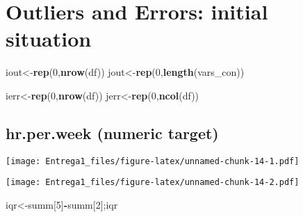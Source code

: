 \documentclass[12pt,]{article}
\newenvironment{Shaded}{\begin{snugshade}}{\end{snugshade}}
\newcommand{\DataTypeTok}[1]{\textcolor[rgb]{0.13,0.29,0.53}{#1}}
\newcommand{\DecValTok}[1]{\textcolor[rgb]{0.00,0.00,0.81}{#1}}
\newcommand{\KeywordTok}[1]{\textcolor[rgb]{0.13,0.29,0.53}{\textbf{#1}}}
\newcommand{\NormalTok}[1]{#1}
\newcommand{\OperatorTok}[1]{\textcolor[rgb]{0.81,0.36,0.00}{\textbf{#1}}}
\newcommand{\StringTok}[1]{\textcolor[rgb]{0.31,0.60,0.02}{#1}}
\begin{document}
\hypertarget{outliers-and-errors-initial-situation}{%
\section{Outliers and Errors: initial
situation}\label{outliers-and-errors-initial-situation}}

\begin{Shaded}
\begin{Highlighting}[]
\NormalTok{iout<-}\KeywordTok{rep}\NormalTok{(}\DecValTok{0}\NormalTok{,}\KeywordTok{nrow}\NormalTok{(df))}
\NormalTok{jout<-}\KeywordTok{rep}\NormalTok{(}\DecValTok{0}\NormalTok{,}\KeywordTok{length}\NormalTok{(vars_con))}

\NormalTok{ierr<-}\KeywordTok{rep}\NormalTok{(}\DecValTok{0}\NormalTok{,}\KeywordTok{nrow}\NormalTok{(df))}
\NormalTok{jerr<-}\KeywordTok{rep}\NormalTok{(}\DecValTok{0}\NormalTok{,}\KeywordTok{ncol}\NormalTok{(df))}
\end{Highlighting}
\end{Shaded}

\hypertarget{hr.per.week-numeric-target}{%
\subsection{hr.per.week (numeric
target)}\label{hr.per.week-numeric-target}}

\begin{Shaded}
\end{Shaded}

\texttt{[image: Entrega1\_files/figure-latex/unnamed-chunk-14-1.pdf]}

\begin{Shaded}
\end{Shaded}

\texttt{[image: Entrega1\_files/figure-latex/unnamed-chunk-14-2.pdf]}

\begin{Shaded}
\begin{Highlighting}[]
\NormalTok{iqr<-summ[}\DecValTok{5}\NormalTok{]}\OperatorTok{-}\NormalTok{summ[}\DecValTok{2}\NormalTok{];iqr}
\end{Highlighting}
\end{Shaded}
\end{document}

